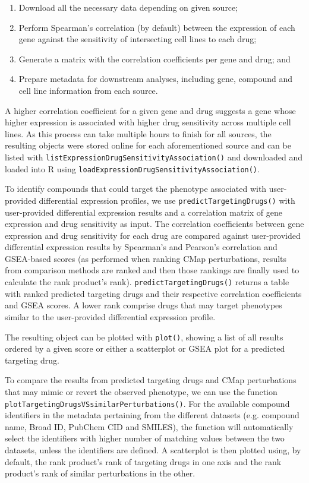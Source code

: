 \begin{enumerate}
	\item Download all the necessary data depending on given source;
	\item Perform Spearman’s correlation (by default) between the expression of each gene against the sensitivity of intersecting cell lines to each drug;
	\item Generate a matrix with the correlation coefficients per gene and drug; and
	\item Prepare metadata for downstream analyses, including gene, compound and cell line information from each source.
\end{enumerate}

A higher correlation coefficient for a given gene and drug suggests a gene whose higher expression is associated with higher drug sensitivity across multiple cell lines. As this process can take multiple hours to finish for all sources, the resulting objects were stored online for each aforementioned source and can be listed with \texttt{listExpressionDrugSensitivityAssociation()} and downloaded and loaded into R using \texttt{loadExpressionDrugSensitivityAssociation()}.

To identify compounds that could target the phenotype associated with user-provided differential expression profiles, we use \texttt{predictTargetingDrugs()} with user-provided differential expression results and a correlation matrix of gene expression and drug sensitivity as input. The correlation coefficients between gene expression and drug sensitivity for each drug are compared against user-provided differential expression results by Spearman’s and Pearson’s correlation and GSEA-based scores (as performed when ranking CMap perturbations, results from comparison methods are ranked and then those rankings are finally used to calculate the rank product’s rank). \texttt{predictTargetingDrugs()} returns a table with ranked predicted targeting drugs and their respective correlation coefficients and GSEA scores. A lower rank comprise drugs that may target phenotypes similar to the user-provided differential expression profile.

The resulting object can be plotted with \texttt{plot()}, showing a list of all results ordered by a given score or either a scatterplot or GSEA plot for a predicted targeting drug.

To compare the results from predicted targeting drugs and CMap perturbations that may mimic or revert the observed phenotype, we can use the function \texttt{plotTargetingDrugsVSsimilarPerturbations()}. For the available compound identifiers in the metadata pertaining from the different datasets (e.g. compound name, Broad ID, PubChem CID and SMILES), the function will automatically select the identifiers with higher number of matching values between the two datasets, unless the identifiers are defined. A scatterplot is then plotted using, by default, the rank product’s rank of targeting drugs in one axis and the rank product’s rank of similar perturbations in the other.

